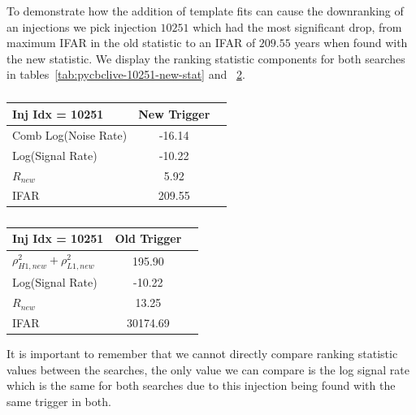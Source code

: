 %
To demonstrate how the addition of template fits can cause the downranking of an injections we pick injection $10251$ which had the most significant drop, from maximum IFAR in the old statistic to an IFAR of $209.55$ years when found with the new statistic. We display the ranking statistic components for both searches in tables~\ref{tab:pycbclive-10251-new-stat} and ~\ref{tab:pycbclive-10251-old-stat}.
%
\begin{table}[ht]
    \centering
    \setlength{\tabcolsep}{4pt}
    \begin{minipage}{0.48\textwidth}
        \centering
        \begin{adjustbox}{minipage=\linewidth-0cm, margin=0cm 0cm 0cm 0cm}
        \begin{tabular}{lcc}
            \toprule
            \textbf{Inj Idx = 10251} & \textbf{New Trigger} \\
            \midrule
            Comb Log(Noise Rate)  & -16.14 \\
            Log(Signal Rate) & -10.22 \\
            $R_{new}$ & 5.92 \\
            IFAR & 209.55 \\
            \bottomrule
        \end{tabular}
        \end{adjustbox}
        \caption{}
        \label{tab:pycbclive-10251-new-stat}
    \end{minipage}
    \hfill
    \begin{minipage}{0.48\textwidth}
        \centering
        \begin{tabular}{lcc}
            \toprule
            \textbf{Inj Idx = 10251} & \textbf{Old Trigger}\\
            \midrule
            $\rho_{H1,new}^2 + \rho_{L1,new}^2$   & 195.90 \\
            Log(Signal Rate) & -10.22 \\
            $R_{new}$ & 13.25 \\
            IFAR & 30174.69 \\
            \bottomrule
        \end{tabular}
        \caption{}
        \label{tab:pycbclive-10251-old-stat}
    \end{minipage}
\end{table}
%
It is important to remember that we cannot directly compare ranking statistic values between the searches, the only value we can compare is the log signal rate which is the same for both searches due to this injection being found with the same trigger in both.

